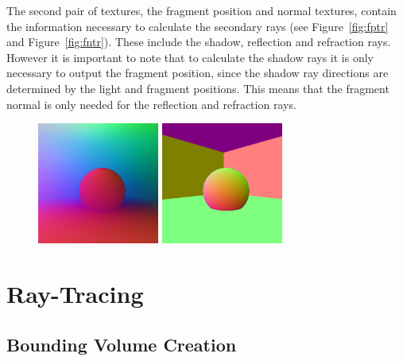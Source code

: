 The second pair of textures, the fragment position and normal textures, contain the information necessary to calculate the secondary rays (see Figure~\ref{fig:fptr} and Figure~\ref{fig:fntr}). These include the shadow, reflection and refraction rays. However it is important to note that to calculate the shadow rays it is only necessary to output the fragment position, since the shadow ray directions are determined by the light and fragment positions. This means that the fragment normal is only needed for the reflection and refraction rays.

\begin{figure}[!htb]
    \begin{minipage}{0.475\linewidth}
        \centering
        \includegraphics[width=4.0cm]{Images/Position_Texture}
    \end{minipage}
    \begin{minipage}{0.475\linewidth}
        \centering
        \includegraphics[width=4.0cm]{Images/Normal_Texture}
    \end{minipage}
\end{figure}

\section{Ray-Tracing}
\label{section:algorithm-ray-tracing}

\subsection{Bounding Volume Creation}

